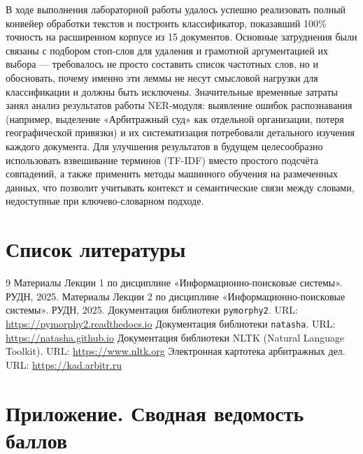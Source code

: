 \documentclass[12pt, a4paper]{report}
\newcommand{\placeholder}[2][Вставьте результат]{%
  \begin{tcolorbox}[placeholderbox, title={#2}]
    #1
  \end{tcolorbox}%
  \vspace{4pt}%
}
\begin{document}
\placeholder[
  В ходе выполнения лабораторной работы удалось успешно реализовать полный конвейер обработки текстов и построить классификатор, показавший 100\% точность на расширенном корпусе из 15 документов. Основные затруднения были связаны с подбором стоп-слов для удаления и грамотной аргументацией их выбора — требовалось не просто составить список частотных слов, но и обосновать, почему именно эти леммы не несут смысловой нагрузки для классификации и должны быть исключены. Значительные временные затраты занял анализ результатов работы NER-модуля: выявление ошибок распознавания (например, выделение «Арбитражный суд» как отдельной организации, потеря географической привязки) и их систематизация потребовали детального изучения каждого документа. Для улучшения результатов в будущем целесообразно использовать взвешивание терминов (TF-IDF) вместо простого подсчёта совпадений, а также применить методы машинного обучения на размеченных данных, что позволит учитывать контекст и семантические связи между словами, недоступные при ключево-словарном подходе.
]{Собственные выводы студента}

\chapter*{Список литературы}

\begin{thebibliography}{9}
    Материалы Лекции 1 по дисциплине «Информационно-поисковые системы».
    РУДН, 2025.
    Материалы Лекции 2 по дисциплине «Информационно-поисковые системы».
    РУДН, 2025.
    Документация библиотеки \texttt{pymorphy2}.
    URL: \url{https://pymorphy2.readthedocs.io}
    Документация библиотеки \texttt{natasha}.
    URL: \url{https://natasha.github.io}
    Документация библиотеки NLTK (Natural Language Toolkit).
    URL: \url{https://www.nltk.org}
    Электронная картотека арбитражных дел.
    URL: \url{https://kad.arbitr.ru}
\end{thebibliography}

\chapter*{Приложение. Сводная ведомость баллов}
\thispagestyle{plain}
\end{document}

